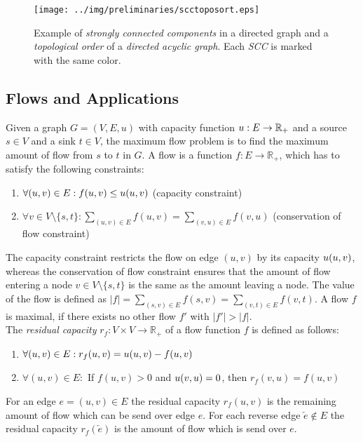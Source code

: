 \begin{figure}[ht!]
\centering
\texttt{[image: ../img/preliminaries/scctoposort.eps]}
\caption{Example of \emph{strongly connected components} in a directed graph and
         a \emph{topological order} of a \emph{directed acyclic graph}. Each 
         \emph{SCC} is marked with the same color.} 
\label{img:scctoposort}
\end{figure}

\subsection{Flows and Applications}
\label{sec:applications}

Given a graph $G = (V,E,u)$ with capacity function $u: E \rightarrow \mathbb{R}_+$ and a source 
$s \in V$ and a sink $t \in V$, the maximum flow problem is to find
the maximum amount of flow from $s$ to $t$ in $G$. A flow is a function 
$f: E \rightarrow \mathbb{R}_+$, which has to satisfy the following constraints:
\begin{enumerate}
\item $\forall (u,v) \in E: f(u,v) \le u(u,v)$ (capacity constraint)
\item $\forall v \in V \setminus \{s,t\}: \sum_{(u,v) \in E} f(u,v) = \sum_{(v,u) \in E} f(v,u)$ (conservation of flow constraint)
\end{enumerate}
The capacity constraint restricts the flow on edge $(u,v)$ by its capacity 
$u(u,v)$, whereas the conservation of flow constraint ensures that the amount
of flow entering a node $v \in V \setminus \{s,t\}$ is the same as the amount leaving a node.
The value of the flow is defined as $|f| = \sum_{(s,v) \in E} f(s,v) = \sum_{(v,t) \in E} f(v,t)$.
A flow $f$ is maximal, if there exists no other flow $f'$ with $|f'| > |f|$. \\
The \emph{residual capacity} $r_f: V \times V \rightarrow \mathbb{R}_+$ of a flow function
$f$ is defined as follows:
\begin{enumerate}
\item $\forall (u,v) \in E: r_f(u,v) = u(u,v) - f(u,v)$
\item $\forall (u,v) \in E:$ If $f(u,v) > 0$ and $u(v,u) = 0$, then $r_f(v,u) = f(u,v)$
\end{enumerate}
For an edge $e = (u,v) \in E$ the residual capacity $r_f(u,v)$ is the remaining amount of 
flow which can be send over edge $e$. For each reverse edge $\overleftarrow{e} \notin E$ the
residual capacity $r_f(\overleftarrow{e})$ is the amount of flow which is send over $e$.
